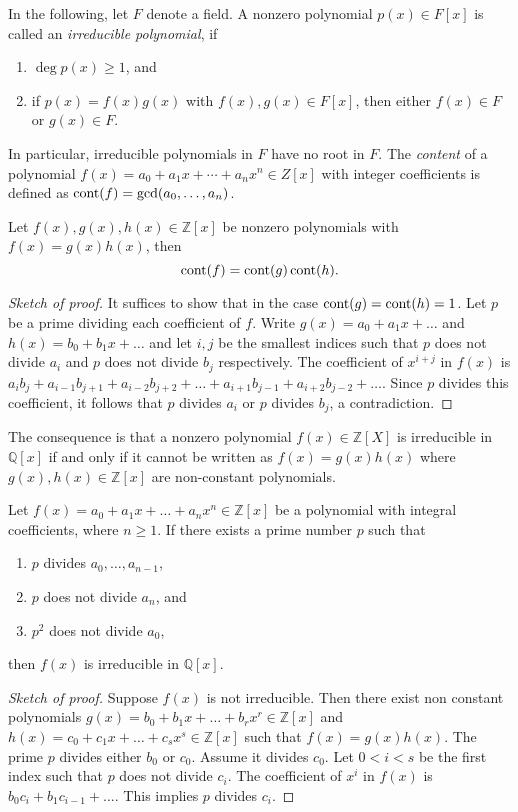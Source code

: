 In the following, let $F$ denote a field. A nonzero polynomial $p(x) ∈ F[x]$ is called an \emph{irreducible polynomial}, if
\begin{enumerate}[(1)]
\item $\deg p(x) ≥1$, and
\item if $p(x) = f(x) g(x)$ with $f(x),g(x) ∈ F[x]$, then either $f(x) ∈ F$ or $g(x) ∈F$. 
\end{enumerate}
In particular, irreducible polynomials in $F$ have no root in $F$.
The \emph{content} of a polynomial $f(x) = a_0 + a_1 x + \cdots + a_n x^n ∈ Z[x]$  with integer coefficients is defined as $\operatorname{cont}(f) = \gcd(a_0,\dots,a_n)$. 

\begin{theorem}
  Let $f(x),g(x), h(x) ∈ℤ[x]$ be nonzero polynomials with $f(x) = g(x) h(x)$, then
  \begin{displaymath}
    \operatorname{cont} (f) = \operatorname{cont} (g) \operatorname{cont} (h).  
  \end{displaymath}
\end{theorem}

\begin{proof}[Sketch of proof] 
  \small It suffices to show that in the case $\operatorname{cont}(g)  = \operatorname{cont}(h) =1$. Let $p$ be a prime dividing each coefficient of $f$. Write $g(x) = a_0 + a_1 x + \dots$ and $h(x) = b_0 + b_1 x + \dots$ and let $i,j$ be the smallest indices such that $p$ does not divide $a_i$ and $p$ does not divide $b_j$  respectively. The coefficient of $x^{i+j}$ in $f(x)$ is $a_ib_j + a_{i-1}b_{j+1} + a_{i-2}b_{j+2}+ \dots + a_{i+1}b_{j-1} + a_{i+2} b_{j-2}+ \dots$. Since $p$ divides this coefficient, it follows that $p$ divides $a_i$ or $p$ divides $b_j$, a contradiction. 
\end{proof}
The consequence is that a nonzero polynomial $f(x) ∈ ℤ[X]$ is irreducible in $ℚ[x]$ if and only if it cannot be written as $f(x) = g(x) h(x)$ where $g(x),h(x) ∈ ℤ[x]$ are non-constant polynomials.

\begin{theorem}
  Let $f(x) = a_0 + a_1 x + \dots + a_n x^n ∈ ℤ[x]$ be a polynomial with integral coefficients, where $n≥1$.  If  there exists a prime number $p$ such  that
  \begin{enumerate}[(1)]
  \item $p$ divides $a_0,\dots,a_{n-1}$,
  \item $p$ does not divide $a_n$, and
  \item $p^2$ does not divide $a_0$, 
  \end{enumerate}
  then $f(x)$ is irreducible in $ℚ[x]$.   
\end{theorem}
\begin{proof}[Sketch of proof] 
Suppose $f(x)$ is not irreducible. Then there exist non constant polynomials $g(x) = b_0+ b_1x + \dots + b_rx^r ∈ℤ[x]$ and $h(x) = c_0+ c_1x+ \dots + c_sx^s ∈ℤ[x]$ such that $f(x) = g(x) h(x)$. The prime $p$ divides either $b_0$ or $c_0$. Assume it divides $c_0$. Let $0<i<s$ be the first index such that $p$  does not divide $c_i$. The coefficient of $x^i$ in $f(x)$ is $b_0c_i + b_1c_{i-1}+ \dots$. This implies $p$ divides $c_i$.  
\end{proof}

